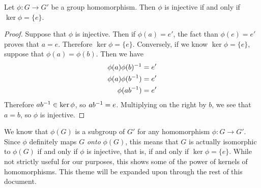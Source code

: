 \begin{theorem}
Let \extra $\phi: G \to G'$ be a group homomorphism. Then $\phi$ is injective if and only if $\ker \phi = \{e\}$.
\end{theorem}

\begin{proof}
Suppose that $\phi$ is injective. Then if $\phi(a) = e'$, the fact than $\phi(e) = e'$ proves that $a = e$. Therefore $\ker\phi = \{e\}$. Conversely, if we know $\ker\phi = \{e\}$, suppose that $\phi(a) = \phi(b)$. Then we have
\begin{align*}
    \phi(a)\phi(b)^{-1} &= e' \\
    \phi(a)\phi(b^{-1}) &= e' \\
    \phi(a b^{-1}) &= e' \\
\end{align*}
Therefore $ab^{-1} \in \ker\phi$, so $ab^{-1} = e$. Multiplying on the right by $b$, we see that $a = b$, so $\phi$ is injective.
\end{proof}

We \extra know that $\phi(G)$ is a subgroup of $G'$ for any homomorphism $\phi: G \to G'$. Since $\phi$ definitely maps $G$ \textit{onto} $\phi(G)$, this means that $G$ is actually isomorphic to $\phi(G)$ if and only if $\phi$ is injective, that is, if and only if $\ker\phi = \{e\}$. While not strictly useful for our purposes, this shows some of the power of kernels of homomorphisms. This theme will be expanded upon through the rest of this document.